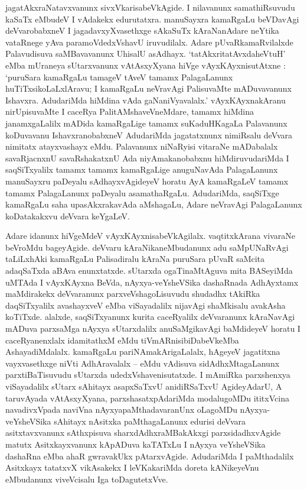 jagatAkxraNatavxvanunx sivxVkarisabeVkAgide. I nilavanunx samathiRsuvudu kaSaTx eMbudeV I vAdakekx edurutatxra. manuSayxra kamaRgaLu beVDavAgi deVvarobabxneV I jagadavxyXvasethxge sAkaSuTx kAraNanAdare neYtika vataRnege yAva paramoVdedxVshavU iruvudilalx. Adare pUvaRkamaRvilalxde Palavudisuva saMBavavanunx UhisalU asAdhayx. `tatAkxritatAvxdaheVtuH' eMba mUraneya sUtarxvanunx vAtAsxyXyana hiVge vAyxKAyxnisutAtxne : `puruSara kamaRgaLu tamageV tAveV tamamx PalagaLanunx huTiTxsikoLaLxlAravu; I kamaRgaLu neVravAgi PalisuvaMte mADuvavanunx Ishavxra. AdudariMda hiMdina vAda gaNaniVyavalalx.' vAyxKAyxnakAranu nirUpisuvaMte I caceRya PalitAMshaveVneMdare, tamamx hiMdina janamxgaLalilx mADida kamaRgaLige tamamx suKaduHKagaLa Palavanunx koDuvavanu IshavxranobabxneV AdudariMda jagatatxnunx nimiRsalu deVvara nimitatx atayxvashayx eMdu. Palavanunx niNaRyisi vitaraNe mADabalalx savaRjacnxnU savaRshakatxnU Ada niyAmakanobabxnu hiMdiruvudariMda I saqSiTxyalilx tamamx tamamx kamaRgaLige anuguNavAda PalagaLanunx manuSayxru paDeyalu sAdhayxvAgideyeV horatu AyA kamaRgaLeV tamamx tamamx PalagaLanunx paDeyalu asamathaRgaLu. AdudariMda, saqSiTxge kamaRgaLu saha upasAkxrakavAda aMshagaLu, Adare neVravAgi PalagaLanunx koDatakakxvu deVvara keYgaLeV.

Adare idanunx hiVgeMdeV vAyxKAyxnisabeVkAgilalx. vaqtitxkArana vivaraNe beVroMdu bageyAgide. deVvaru kAraNikaneMbudanunx adu saMpUNaRvAgi taLiLxhAki kamaRgaLu Palisadiralu kAraNa puruSara pUvaR saMcita adaqSaTxda aBAva enunxtatxde. sUtarxda ogaTinaMtAguva mita BASeyiMda uMTAda I vAyxKAyxna BeVda, nAyxya-veYsheVSika dashaRnada AdhAyxtamx maMdirakekx deVvaranunx parxveVshagoLisuvudu shudadhx tAkiRka daqSiTxyalilx avashayxveV eMba viSayadalilx nijavAgi shaMkisalu avakAsha koTiTxde. alalxde, saqSiTxyanunx kurita caceRyalilx deVvaranunx kAraNavAgi mADuva parxsaMga nAyxya sUtarxdalilx anuSaMgikavAgi baMdideyeV horatu I caceRyanenxlalx idamitathxM eMdu tiVmARnisibiDabeVkeMba AshayadiMdalalx. kamaRgaLu pariNAmakArigaLalalx, hAgeyeV jagatitxna vayxvasethxge niVti AdhAravalalx -- eMdu vAdisuva sidAdhxMtagaLanunx parxtiBaTisuvudu sUtarxda udedxVshavenisutatxde. I mAmiRka parxshenxya viSayadalilx sUtarx sAhitayx asapxSaTxvU anidiRSaTxvU AgideyAdarU, A taruvAyada vAtAsxyXyana, parxshasatxpAdariMda modalugoMDu ititxVcina navadivxVpada naviVna nAyxyapaMthadavaranUnx oLagoMDu nAyxya-veYsheVSika sAhitayx nAsitxka paMthagaLanunx edurisi deVvara asitxtavxvanunx sAthxpisuva sharxdAdhxraMBakAkxgi parxsidadhxvAgide matutx Asitxkayxvanunx kApADuva kaTATxLu I nAyxya veYsheVSika dashaRna eMba ahaR gwravakUkx pAtarxvAgide. AdudariMda I paMthadalilx Asitxkayx tatatxvX vikAsakekx I leVKakariMda doreta kANikeyeVnu eMbudanunx viveVcisalu Iga toDagutetxVve.

